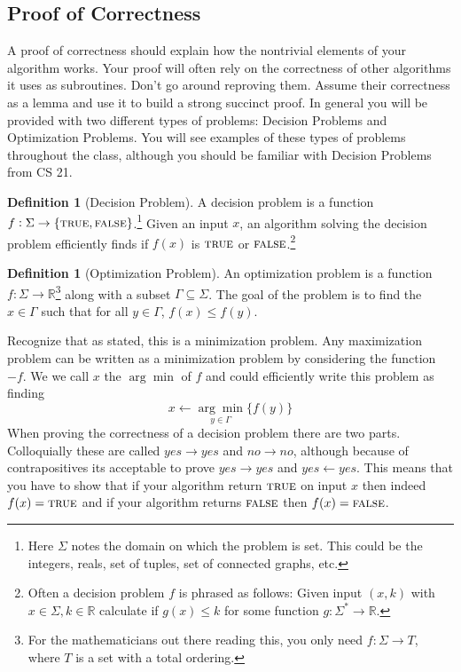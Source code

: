 \documentclass[11pt]{article}
\theoremstyle{plain}
\theoremstyle{definition}
\newtheorem{defn}[thm]{Definition} %
\newcommand{\RR}{\mathbb{R}}
\newcommand{\short}[1]{\mbox{\sc #1}}
\newcommand{\true}{\short{true}}
\newcommand{\false}{\short{false}}
\numberwithin{equation}{section}
\numberwithin{figure}{section}
\begin{document}
\subsection{Proof of Correctness}
A proof of correctness should explain how the nontrivial elements of your algorithm works. Your proof will often rely on the correctness of other algorithms it uses as subroutines. Don't go around reproving them. Assume their correctness as a lemma and use it to build a strong succinct proof. In general you will be provided with two different types of problems: Decision Problems and Optimization Problems. You will see examples of these types of problems throughout the class, although you should be familiar with Decision Problems from CS 21.

\begin{defn}[Decision Problem]
A decision problem is a function $f : \Sigma \rightarrow \{\true, \false\}$.\footnote{Here $\Sigma$ notes the domain on which the problem is set. This could be the integers, reals, set of tuples, set of connected graphs, etc.} Given an input $x$, an algorithm solving the decision problem efficiently finds if $f(x)$ is $\true$ or $\false$.\footnote{ Often a decision problem $f$ is phrased as follows: Given input $(x,k)$ with $x \in \Sigma, k \in \RR$  calculate if $g(x) \leq k$ for some function $g: \Sigma^* \rightarrow \RR$.}
\end{defn}

\begin{defn}[Optimization Problem]
An optimization problem is a function $f : \Sigma \rightarrow \RR$\footnote{For the mathematicians out there reading this, you only need $f: \Sigma \rightarrow T$, where $T$ is a set with a total ordering.} along with a subset $\Gamma \subseteq \Sigma$. The goal of the problem is to find the $x \in \Gamma$ such that for all $y \in \Gamma$, $f(x) \leq f(y)$. 
\end{defn}

\noindent Recognize that as stated, this is a minimization problem. Any maximization problem can be written as a minimization problem by considering the function $-f$. We we call $x$ the $\arg \min$ of $f$ and could efficiently write this problem as finding
\begin{equation}
x \leftarrow \underset{y \in \Gamma}{\arg \min} \{f(y) \}
\end{equation}
When proving the correctness of a decision problem there are two parts. Colloquially these are called $yes \rightarrow yes$ and $no \rightarrow no$, although because of contrapositives its acceptable to prove $yes \rightarrow yes$ and $yes \leftarrow yes$. This means that you have to show that if your algorithm return $\true$ on input $x$ then indeed $f(x) = \true$ and if your algorithm returns $\false$ then $f(x) = \false$. \\
\end{document}
